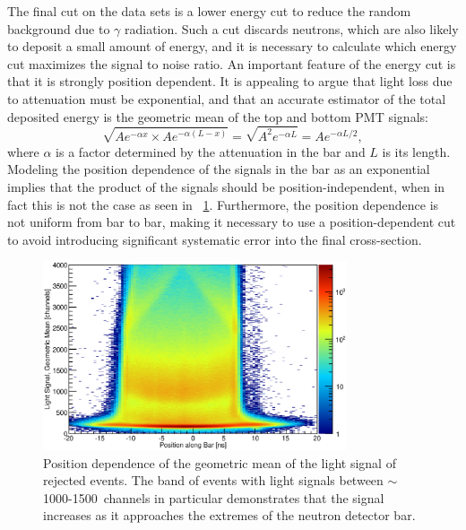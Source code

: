 The final cut on the data sets is a lower energy cut to reduce the random background due to $\gamma$ radiation.  Such a cut discards neutrons, which are also likely to deposit a small amount of energy, and it is necessary to calculate which energy cut maximizes the signal to noise ratio.  An important feature of the energy cut is that it is strongly position dependent.  It is appealing to argue that light loss due to attenuation must be exponential, and that an accurate estimator of the total deposited energy is the geometric mean of the top and bottom PMT signals:
\begin{equation}
\sqrt{Ae^{-\alpha x}\times Ae^{-\alpha (L-x)}} = \sqrt{A^2e^{-\alpha L}} = Ae^{-\alpha L/2},
\end{equation}
where $\alpha$ is a factor determined by the attenuation in the bar and $L$ is its length.  Modeling the position dependence of the signals in the bar as an exponential implies that the product of the signals should be position-independent, when in fact this is not the case as seen in {\fig}~\ref{fig:product_positionDependence}.  Furthermore, the position dependence is not uniform from bar to bar, making it necessary to use a position-dependent cut to avoid introducing significant systematic error into the final cross-section.
\begin{figure}[!htbp]
\centering
\includegraphics[width=0.8\textwidth]{figures/positionVSenergy.eps}
\caption{Position dependence of the geometric mean of the light signal of rejected events.  The band of events with light signals between $\sim$1000-1500~channels in particular demonstrates that the signal increases as it approaches the extremes of the neutron detector bar.}
\label{fig:product_positionDependence}
\end{figure}


